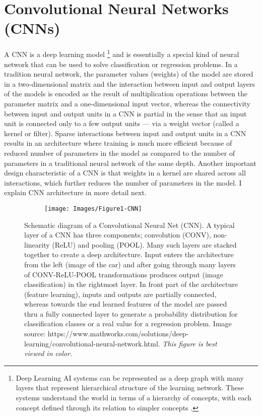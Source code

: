 \documentclass [11pt,letterpaper ,twoside ,openany ]{report}
\begin{document}
     \section{Convolutional Neural Networks (CNNs)}
     A CNN is a deep learning model \footnote {Deep Learning AI systems can be represented as a deep graph with many layers that represent hierarchical structure of the learning network. These systems understand the world in terms of a hierarchy of concepts, with each concept defined through its relation to simpler concepts \cite{Goodfellow-et-al-2016}.} and is essentially a special kind of neural network that can be used to solve classification or regression problems. In a tradition neural network, the parameter values (weights) of the model are stored in a two-dimensional matrix and the interaction between input and output layers of the models is encoded as the result of multiplication operations between the parameter matrix and a one-dimensional input vector, whereas the connectivity between input and output units in a CNN is partial in the sense that an input unit is connected only to a few output units --- via a weight vector (called a kernel or filter). Sparse interactions between input and output units in a CNN results in an architecture where training is much more efficient because of reduced number of parameters in the model as compared to the number of parameters in a traditional neural network of the same depth. Another important design characteristic of a CNN is that weights in a kernel are shared across all interactions, which further reduces the number of parameters in the model. I explain CNN architecture in more detail next. 

    \begin{figure}[t!]
      \centering
      \begin{subfigure}[b]{0.98\linewidth}
        \texttt{[image: Images/Figure1-CNN]}
      \end{subfigure}
      \caption{Schematic diagram of a Convolutional Neural Net (CNN). A typical layer of a CNN has three components; convolution (CONV), non-linearity (ReLU) and pooling (POOL). Many such layers are stacked together to create a deep architecture. Input enters the architecture from the left (image of the car) and after going through many layers of CONV-ReLU-POOL transformations produces output (image classification) in the rightmost layer. In front part of the architecture (feature learning), inputs and outputs are partially connected, whereas towards the end learned features of the model are passed thru a fully connected layer to generate a probability distribution for classification classes or a real value for a regression problem. Image source: https://www.mathworks.com/solutions/deep-learning/convolutional-neural-network.html. \textit{This figure is best viewed in color.}}
      \label{fig:cnn}
    \end{figure}
\end{document}
